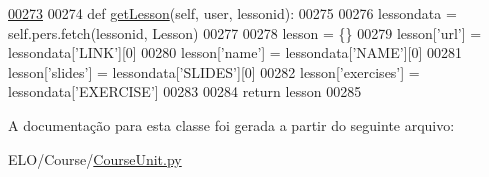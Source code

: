 \begin{DoxyCode}
\hypertarget{classCourse_1_1CourseUnit_1_1BusCourse_l00273}{}\hyperlink{classCourse_1_1CourseUnit_1_1BusCourse_ac7325f4b22028b3885d52d14af3a12cf}{00273} 
00274     \textcolor{keyword}{def }\hyperlink{classCourse_1_1CourseUnit_1_1BusCourse_ac7325f4b22028b3885d52d14af3a12cf}{getLesson}(self, user, lessonid):
00275 
00276         lessondata = self.pers.fetch(lessonid, Lesson)
00277 
00278         lesson = \{\}
00279         lesson[\textcolor{stringliteral}{'url'}] = lessondata[\textcolor{stringliteral}{'LINK'}][0]
00280         lesson[\textcolor{stringliteral}{'name'}] = lessondata[\textcolor{stringliteral}{'NAME'}][0]
00281         lesson[\textcolor{stringliteral}{'slides'}] = lessondata[\textcolor{stringliteral}{'SLIDES'}][0]
00282         lesson[\textcolor{stringliteral}{'exercises'}] = lessondata[\textcolor{stringliteral}{'EXERCISE'}]
00283 
00284         \textcolor{keywordflow}{return} lesson
00285 

\end{DoxyCode}


A documentação para esta classe foi gerada a partir do seguinte arquivo\-:\begin{DoxyCompactItemize}
\item 
E\-L\-O/\-Course/\hyperlink{CourseUnit_8py}{Course\-Unit.\-py}\end{DoxyCompactItemize}
